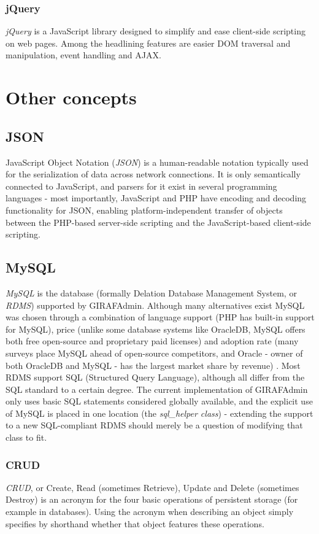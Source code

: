 \subsubsection*{jQuery}
\emph{jQuery} is a JavaScript library designed to simplify and ease client-side scripting on web pages. Among the headlining features are easier DOM traversal and manipulation, event handling and AJAX.

\section{Other concepts}

\subsection*{JSON}
JavaScript Object Notation (\emph{JSON}) is a human-readable notation typically used for the serialization of data across network connections. It is only semantically connected to JavaScript, and parsers for it exist in several programming languages - most importantly, JavaScript and PHP have encoding and decoding functionality for JSON, enabling platform-independent transfer of objects between the PHP-based server-side scripting and the JavaScript-based client-side scripting.

\subsection*{MySQL}
\emph{MySQL} is the database (formally Delation Database Management System, or \emph{RDMS}) supported by GIRAFAdmin. Although many alternatives exist MySQL was chosen through a combination of language support (PHP has built-in support for MySQL), price (unlike some database systems like OracleDB, MySQL offers both free open-source and proprietary paid licenses) and adoption rate (many surveys place MySQL ahead of open-source competitors, and Oracle - owner of both OracleDB and MySQL - has the largest market share by revenue) \cite{mysqlpenetration}\cite{mysqlmarketshare}. Most RDMS support SQL (Structured Query Language), although all differ from the SQL standard to a certain degree. The current implementation of GIRAFAdmin only uses basic SQL statements considered globally available, and the explicit use of MySQL is placed in one location (the \emph{sql\_helper class}) - extending the support to a new SQL-compliant RDMS should merely be a question of modifying that class to fit.

\subsubsection*{CRUD}
\label{CRUD}
\emph{CRUD}, or Create, Read (sometimes Retrieve), Update and Delete (sometimes Destroy) is an acronym for the four basic operations of persistent storage (for example in databases). Using the acronym when describing an object simply specifies by shorthand whether that object features these operations.